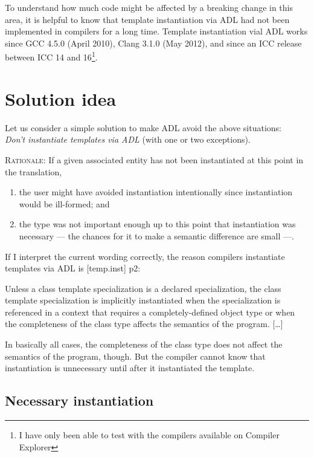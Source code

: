 To understand how much code might be affected by a breaking change in this area, it is 
helpful to know that template instantiation via ADL had not been implemented in compilers 
for a long time. Template instantiation vial ADL works since GCC 4.5.0 (April 2010), Clang 
3.1.0 (May 2012), and since an ICC release between ICC 14 and 16\footnote{I have only been 
  able to test with the compilers available on Compiler Explorer}.

\pagebreak

\section{Solution idea}

Let us consider a simple solution to make ADL avoid the above situations:\\
\emph{Don't instantiate templates via ADL} (with one or two exceptions).

\textsc{Rationale:} If a given associated entity has not been instantiated at this point 
in the translation,
\begin{enumerate}
\item the user might have avoided instantiation intentionally since instantiation would be 
ill-formed; and
\item the type was not important enough up to this point that instantiation was necessary 
--- the chances for it to make a semantic difference are small ---.
\end{enumerate}

If I interpret the current wording correctly, the reason compilers instantiate templates 
via ADL is [temp.inst] p2:
\begin{wgText}

\setcounter{Paras}{1}
\pnum Unless a class template specialization is a declared specialization, the class 
template specialization is implicitly instantiated when the specialization is referenced 
in a context that requires a completely-defined object type or when the completeness of 
the class type affects the semantics of the program. [\ldots]

\end{wgText}
In basically all cases, the completeness of the class type does not affect the semantics 
of the program, though. But the compiler cannot know that instantiation is unnecessary 
until after it instantiated the template.


\subsection{Necessary instantiation}

